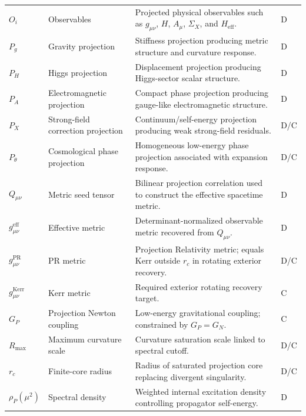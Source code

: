 \documentclass[11pt]{article}
\newcommand{\PR}{\mathrm{PR}}
\newcommand{\eff}{\mathrm{eff}}
\newcommand{\Kerr}{\mathrm{Kerr}}
\begin{document}
\begin{longtable}{>{\raggedright\arraybackslash}p{}
>{\raggedright\arraybackslash}p{}
>{\raggedright\arraybackslash}p{}
>{\centering\arraybackslash}p{}}
$O_i$ & Observables & Projected physical observables such as $g_{\mu\nu}$, $H$, $A_\mu$, $\Sigma_X$, and $H_{\eff}$. & D \\

$P_g$ & Gravity projection & Stiffness projection producing metric structure and curvature response. & D \\

$P_H$ & Higgs projection & Displacement projection producing Higgs-sector scalar structure. & D \\

$P_A$ & Electromagnetic projection & Compact phase projection producing gauge-like electromagnetic structure. & D \\

$P_X$ & Strong-field correction projection & Continuum/self-energy projection producing weak strong-field residuals. & D/C \\

$P_\theta$ & Cosmological phase projection & Homogeneous low-energy phase projection associated with expansion response. & D/C \\

$Q_{\mu\nu}$ & Metric seed tensor & Bilinear projection correlation used to construct the effective spacetime metric. & D \\

$g_{\mu\nu}^{\eff}$ & Effective metric & Determinant-normalized observable metric recovered from $Q_{\mu\nu}$. & D \\

$g_{\mu\nu}^{\PR}$ & PR metric & Projection Relativity metric; equals Kerr outside $r_c$ in rotating exterior recovery. & D/C \\

$g_{\mu\nu}^{\Kerr}$ & Kerr metric & Required exterior rotating recovery target. & C \\

$G_P$ & Projection Newton coupling & Low-energy gravitational coupling; constrained by $G_P=G_N$. & C \\

$R_{\max}$ & Maximum curvature scale & Curvature saturation scale linked to spectral cutoff. & D/C \\

$r_c$ & Finite-core radius & Radius of saturated projection core replacing divergent singularity. & D/C \\

$\rho_P(\mu^2)$ & Spectral density & Weighted internal excitation density controlling propagator self-energy. & D \\


\end{longtable}
\end{document}
